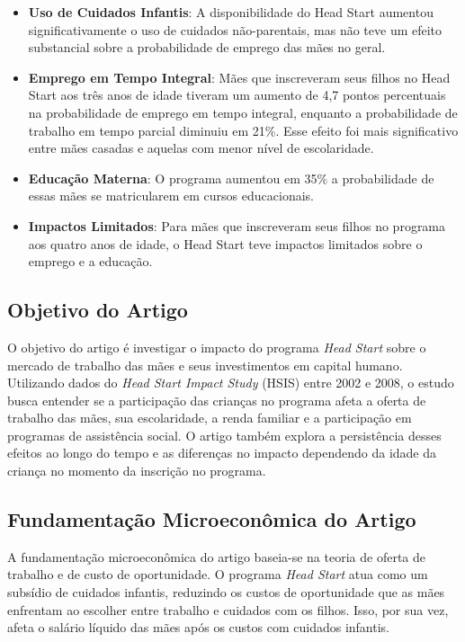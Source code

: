 \documentclass[a4paper,12pt]{article}[abntex2]
\begin{document}
\begin{itemize}
    \item \textbf{Uso de Cuidados Infantis}: A disponibilidade do Head Start aumentou significativamente o uso de cuidados não-parentais, mas não teve um efeito substancial sobre a probabilidade de emprego das mães no geral.
    \item \textbf{Emprego em Tempo Integral}: Mães que inscreveram seus filhos no Head Start aos três anos de idade tiveram um aumento de 4,7 pontos percentuais na probabilidade de emprego em tempo integral, enquanto a probabilidade de trabalho em tempo parcial diminuiu em 21\%. Esse efeito foi mais significativo entre mães casadas e aquelas com menor nível de escolaridade.
    \item \textbf{Educação Materna}: O programa aumentou em 35\% a probabilidade de essas mães se matricularem em cursos educacionais.
    \item \textbf{Impactos Limitados}: Para mães que inscreveram seus filhos no programa aos quatro anos de idade, o Head Start teve impactos limitados sobre o emprego e a educação.
\end{itemize}
\subsection{\textbf{Objetivo do Artigo}}
O objetivo do artigo é investigar o impacto do programa \textit{Head Start} sobre o mercado de trabalho das mães e seus investimentos em capital humano. Utilizando dados do \textit{Head Start Impact Study} (HSIS) entre 2002 e 2008, o estudo busca entender se a participação das crianças no programa afeta a oferta de trabalho das mães, sua escolaridade, a renda familiar e a participação em programas de assistência social. O artigo também explora a persistência desses efeitos ao longo do tempo e as diferenças no impacto dependendo da idade da criança no momento da inscrição no programa.
\subsection{\textbf{Fundamentação Microeconômica do Artigo}}

A fundamentação microeconômica do artigo baseia-se na teoria de oferta de trabalho e de custo de oportunidade. O programa \textit{Head Start} atua como um subsídio de cuidados infantis, reduzindo os custos de oportunidade que as mães enfrentam ao escolher entre trabalho e cuidados com os filhos. Isso, por sua vez, afeta o salário líquido das mães após os custos com cuidados infantis.
\end{document}
